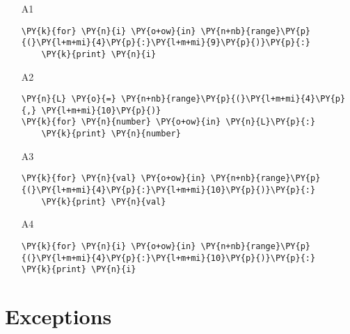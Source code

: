 \begin{enumerate}
\begin{enumerate}
\item[A1] 
\begin{Verbatim}[commandchars=\\\{\}]
\PY{k}{for} \PY{n}{i} \PY{o+ow}{in} \PY{n+nb}{range}\PY{p}{(}\PY{l+m+mi}{4}\PY{p}{:}\PY{l+m+mi}{9}\PY{p}{)}\PY{p}{:}
    \PY{k}{print} \PY{n}{i}
\end{Verbatim}
\item[A2] 
\begin{Verbatim}[commandchars=\\\{\}]
\PY{n}{L} \PY{o}{=} \PY{n+nb}{range}\PY{p}{(}\PY{l+m+mi}{4}\PY{p}{,} \PY{l+m+mi}{10}\PY{p}{)}
\PY{k}{for} \PY{n}{number} \PY{o+ow}{in} \PY{n}{L}\PY{p}{:}
    \PY{k}{print} \PY{n}{number}
\end{Verbatim}
\item[A3] 
\begin{Verbatim}[commandchars=\\\{\}]
\PY{k}{for} \PY{n}{val} \PY{o+ow}{in} \PY{n+nb}{range}\PY{p}{(}\PY{l+m+mi}{4}\PY{p}{:}\PY{l+m+mi}{10}\PY{p}{)}\PY{p}{:}
    \PY{k}{print} \PY{n}{val}
\end{Verbatim}
\item[A4] 
\begin{Verbatim}[commandchars=\\\{\}]
\PY{k}{for} \PY{n}{i} \PY{o+ow}{in} \PY{n+nb}{range}\PY{p}{(}\PY{l+m+mi}{4}\PY{p}{:}\PY{l+m+mi}{10}\PY{p}{)}\PY{p}{:}
\PY{k}{print} \PY{n}{i}
\end{Verbatim}
\end{enumerate}

\vspace{6mm}

\end{enumerate}



\section{Exceptions}

